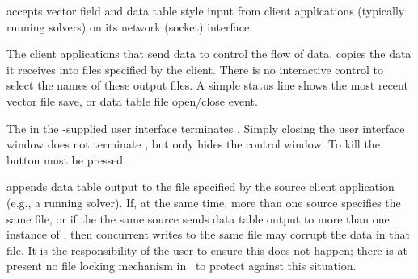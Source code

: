  accepts vector field and data table style input from
client applications (typically running solvers) on its network (socket)
interface.

The client applications that send data to  control the
flow of data.   copies the data it receives into files
specified by the client.  There is no interactive control to select the
names of these output files.  A simple status line shows the most recent
vector file save, or data table file open/close event.

The  in the -supplied user interface terminates
.  Simply closing the user interface window does not
terminate , but only hides the control window.  To kill
 the  button must be pressed.

 appends data table output to the file specified by the
source client application (e.g., a running solver).  If, at the same
time, more than one source specifies the same file, or if the the same
source sends data table output to more than one instance of
, then concurrent writes to the same file may corrupt the
data in that file.  It is the responsibility of the user to ensure this
does not happen; there is at present no file locking mechanism in
\OOMMF\ to protect against this situation.

